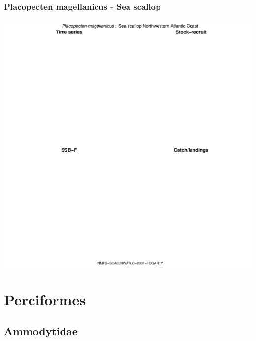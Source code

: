 \subsubsection{Placopecten magellanicus - Sea scallop}
\begin{center}
\includegraphics[width=1.2\textwidth]{../R/figures/NMFS-SCALLNWATLC-2007-FOGARTY.pdf}
\end{center}

\section{Perciformes}

\subsection{Ammodytidae}

